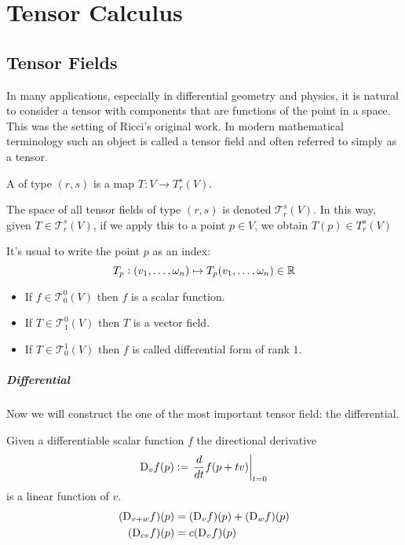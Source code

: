 
\chapter{Tensor Calculus}

\section{Tensor Fields}


In many applications, especially in differential geometry and physics, it is natural to consider a tensor with components that are functions of the point in a space.  This was the setting of Ricci's original work.  In modern mathematical terminology such an object is called a tensor field and  often referred to simply as a tensor.

\begin{df}
  A   of type  
$(r,s)$ is a map  $T:V\to T_{r}^s(V)$.
\end{df}
The space of all tensor fields of type $(r,s)$ is denoted $ \mathcal{T}_{r}^s(V)$.
In this way, given $T\in \mathcal{T}_{r}^s(V)$, if we apply this to a point $p \in V$, we obtain $T(p)\in T_{r}^s(V)$


It's usual to write the point $p$ as an index:
\[T_p :(v_1,\dots, \omega_n) \mapsto T_p(v_1,\dots, \omega_n) \in \mathbb{R}\]


\begin{exa} \mbox{}
 \begin{itemize}
 \item If $f\in \mathcal{T}_{0}^0(V)$ then $f$ is a scalar function.
  \item If $T\in \mathcal{T}_{1}^0(V)$ then $T$ is a vector field.
   \item If $T\in \mathcal{T}_{0}^1(V)$ then $f$ is called differential form of rank $1$.
 \end{itemize}
\end{exa}

\paragraph{Differential}
Now we will construct the one of the most important tensor field: the differential.
 
 Given a differentiable scalar function $f$ the directional derivative 
 \[{\mathrm{D}}_vf(p):= \left. \dfrac{d}{dt} f(p+tv)\right|_{t=0}\]
 is a linear function of $v$.
 \begin{align}
  ({\mathrm{D}}_{v + w} f)(p) &= ({\mathrm{D}}_v f)(p) + ({\mathrm{D}}_w f)(p) \\
    ({\mathrm{D}}_{c v} f)(p) &= c ({\mathrm{D}}_v f)(p)
\end{align}
 
